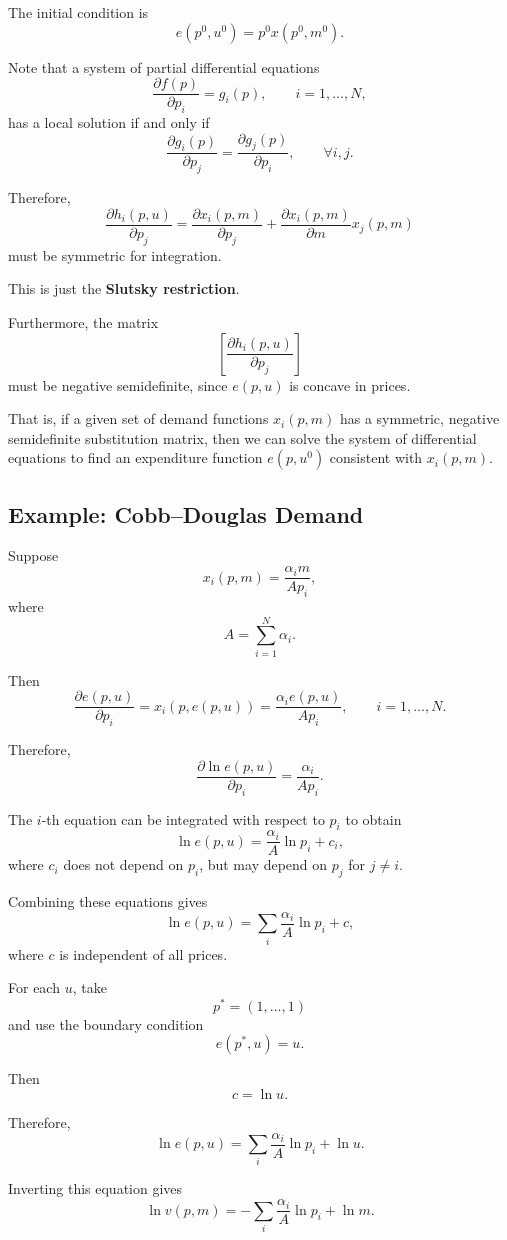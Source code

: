 The initial condition is
\[
e(p^0,u^0)=p^0x(p^0,m^0).
\]

Note that a system of partial differential equations
\[
\frac{\partial f(p)}{\partial p_i}
=
g_i(p),
\qquad
i=1,\dots,N,
\]
has a local solution if and only if
\[
\frac{\partial g_i(p)}{\partial p_j}
=
\frac{\partial g_j(p)}{\partial p_i},
\qquad
\forall i,j.
\]

Therefore,
\[
\frac{\partial h_i(p,u)}{\partial p_j}
=
\frac{\partial x_i(p,m)}{\partial p_j}
+
\frac{\partial x_i(p,m)}{\partial m}x_j(p,m)
\]
must be symmetric for integration.

This is just the \textbf{Slutsky restriction}.

Furthermore, the matrix
\[
\left[
\frac{\partial h_i(p,u)}{\partial p_j}
\right]
\]
must be negative semidefinite, since \(e(p,u)\) is concave in prices.

That is, if a given set of demand functions \(x_i(p,m)\) has a symmetric, negative semidefinite substitution matrix, then we can solve the system of differential equations to find an expenditure function \(e(p,u^0)\) consistent with \(x_i(p,m)\).

\subsection{Example: Cobb--Douglas Demand}

Suppose
\[
x_i(p,m)
=
\frac{\alpha_i m}{A p_i},
\]
where
\[
A=\sum_{i=1}^N \alpha_i.
\]

Then
\[
\frac{\partial e(p,u)}{\partial p_i}
=
x_i(p,e(p,u))
=
\frac{\alpha_i e(p,u)}{A p_i},
\qquad
i=1,\dots,N.
\]

Therefore,
\[
\frac{\partial \ln e(p,u)}{\partial p_i}
=
\frac{\alpha_i}{A p_i}.
\]

The \(i\)-th equation can be integrated with respect to \(p_i\) to obtain
\[
\ln e(p,u)
=
\frac{\alpha_i}{A}\ln p_i
+
c_i,
\]
where \(c_i\) does not depend on \(p_i\), but may depend on \(p_j\) for \(j\ne i\).

Combining these equations gives
\[
\ln e(p,u)
=
\sum_i \frac{\alpha_i}{A}\ln p_i
+
c,
\]
where \(c\) is independent of all prices.

For each \(u\), take
\[
p^*=(1,\dots,1)
\]
and use the boundary condition
\[
e(p^*,u)=u.
\]

Then
\[
c=\ln u.
\]

Therefore,
\[
\ln e(p,u)
=
\sum_i \frac{\alpha_i}{A}\ln p_i
+
\ln u.
\]

Inverting this equation gives
\[
\ln v(p,m)
=
-
\sum_i \frac{\alpha_i}{A}\ln p_i
+
\ln m.
\]

